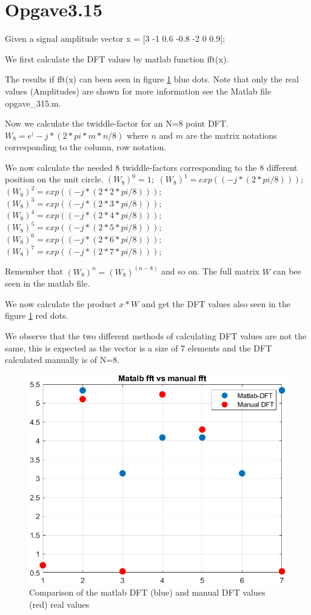 \section{Opgave3.15}

Given a signal amplitude vector x = [3 -1 0.6 -0.8  -2 0 0.9];

We first calculate the DFT values by matlab function fft(x).

The results if fft(x) can been seen in figure \ref{fig:opg315} blue dots. Note that only the real values (Amplitudes) are shown for more information see the Matlab file opgave_315.m.

Now we calculate the twiddle-factor for an N=8 point DFT.
$W_8 = e^(-j*(2*pi*m*n/8)$ where $n$ and $m$ are the matrix notations corresponding to the column, row notation.

We now calculate the needed 8 twiddle-factors corresponding to the 8 different position on the unit circle. 
$(W_8)^0 = 1;$\n
$(W_8)^1 = exp((-j*(2*pi/8)));$\n
$(W_8)^2 = exp((-j*(2*2*pi/8)));$\n
$(W_8)^3 = exp((-j*(2*3*pi/8)));$\n
$(W_8)^4 = exp((-j*(2*4*pi/8)));$\n
$(W_8)^5 = exp((-j*(2*5*pi/8)));$\n
$(W_8)^6 = exp((-j*(2*6*pi/8)));$\n
$(W_8)^7 = exp((-j*(2*7*pi/8)));$\n
 
Remember that $(W_8)^n = (W_8)^(n-8)$ and so on. 
The full matrix $W$ can bee seen in the matlab file.

We now calculate the product $x*W$ and get the DFT values also seen in the figure \ref{fig:opg315} red dots. 

We observe that the two different methods of calculating DFT values are not the same, this is expected as the vector is a size of 7 elements and the DFT calculated manually is of N=8.

\begin{figure}[H]
    \centering
    \includegraphics[width=1\textwidth]{matlabStuff/opg315.PNG}
     \caption{Comparison of the matlab DFT (blue) and manual DFT values (red) real values}
    \label{fig:opg315}
\end{figure}
